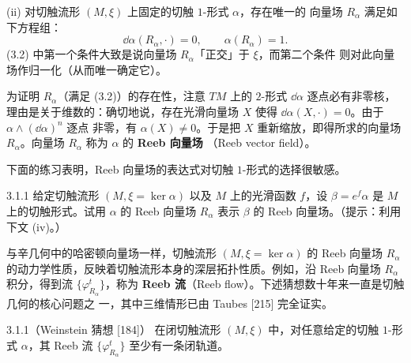 (ii) 对切触流形 $(M,\xi)$ 上固定的切触 $1$-形式 $\alpha$，存在唯一的
向量场 $R_\alpha$ 满足如下方程组：
\begin{equation}\tag{3.2}
  \dd\alpha(R_\alpha,\cdot)=0,\qquad \alpha(R_\alpha)=1.
\end{equation}
(3.2) 中第一个条件大致是说向量场 $R_\alpha$「正交」于 $\xi$，而第二个条件
则对此向量场作归一化（从而唯一确定它）。

为证明 $R_\alpha$（满足 (3.2)）的存在性，注意 $TM$ 上的 $2$-形式
$\dd\alpha$ 逐点必有非零核，理由是关于维数的：确切地说，存在光滑向量场
$X$ 使得 $\dd\alpha(X,\cdot)=0$。由于 $\alpha\wedge(\dd\alpha)^n$ 逐点
非零，有 $\alpha(X)\neq0$。于是把 $X$ 重新缩放，即得所求的向量场
$R_\alpha$。向量场 $R_\alpha$ 称为 $\alpha$ 的 \textbf{Reeb 向量场}
（Reeb vector field）。


下面的练习表明，Reeb 向量场的表达式对切触 $1$-形式的选择很敏感。

\begin{wexer}{3.1.1}
给定切触流形 $(M,\xi=\ker\alpha)$ 以及 $M$ 上的光滑函数 $f$，设
$\beta=e^f\alpha$ 是 $M$ 上的切触形式。试用 $\alpha$ 的 Reeb 向量场
$R_\alpha$ 表示 $\beta$ 的 Reeb 向量场。（提示：利用下文 (iv)。）
\end{wexer}


与辛几何中的哈密顿向量场一样，切触流形 $(M,\xi=\ker\alpha)$ 的 Reeb 向量场
$R_\alpha$ 的动力学性质，反映着切触流形本身的深层拓扑性质。例如，沿 Reeb
向量场 $R_\alpha$ 积分，得到流 $\{\varphi^t_{R_\alpha}\}$，称为
\textbf{Reeb 流}（Reeb flow）。下述猜想数十年来一直是切触几何的核心问题之
一，其中三维情形已由 Taubes [215] 完全证实。

\begin{wconj}{3.1.1}（Weinstein 猜想 [184]）
在闭切触流形 $(M,\xi)$ 中，对任意给定的切触 $1$-形式 $\alpha$，其 Reeb 流
$\{\varphi^t_{R_\alpha}\}$ 至少有一条闭轨道。
\end{wconj}

